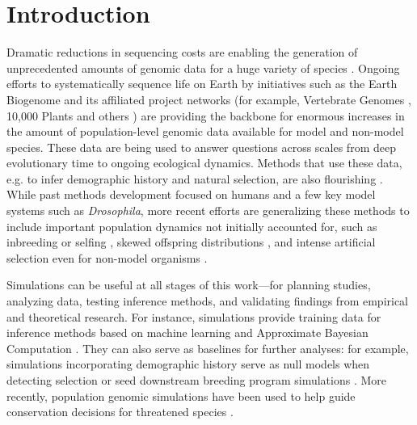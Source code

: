 \documentclass[hidelinks]{article}
\begin{document}
\section*{Introduction}
    \label{introduction}

Dramatic reductions in sequencing costs are enabling the generation of
unprecedented amounts of genomic data for a huge variety of species
\citep{Ellegren2014}. Ongoing efforts to systematically sequence life on
Earth by initiatives such as the Earth Biogenome \citep{Lewin2022} and its
affiliated project networks (for example, Vertebrate Genomes
\citep{Rhie2021}, 10,000 Plants \citep{Cheng2018} and others \citep{darwin2022sequence}) are
providing the backbone for enormous increases in the amount of population-level genomic data
available for model and non-model species.
These data are being used to answer questions across scales
from deep evolutionary time to ongoing ecological dynamics.
Methods that use these data, e.g. to infer demographic history and natural selection,
are also flourishing \citep{Beichman2018}.
While past methods development focused on humans and a few key model systems such as \emph{Drosophila},
more recent efforts are generalizing these methods to include 
important population dynamics not initially accounted for,
such as inbreeding or selfing \citep{Blischak2020}, skewed offspring
distributions \citep{Montano2016}, and intense artificial selection even for non-model organisms \citep{MacLeod2013, MacLeod2014}.

Simulations can be useful at all stages of this work---for
planning studies, analyzing data, testing inference methods,
and validating findings from empirical and theoretical research.
For instance, simulations provide training data
for inference methods based on machine learning \citep{Schrider2018} and
Approximate Bayesian Computation \citep{Csillery2010}. They can also serve as
baselines for further analyses: for example, simulations incorporating
demographic history serve as null models when detecting selection \citep{Hsieh2016a}
or seed downstream breeding program simulations \citep{Gaynor2020}.
More recently, population genomic simulations have been used to help guide conservation decisions for threatened species
\citep{Teixeira2021,kyriazis2022using}.
\end{document}
